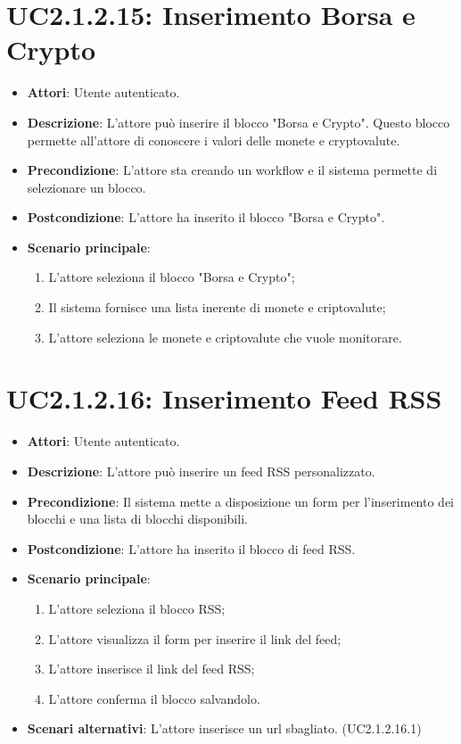 \section{UC2.1.2.15: Inserimento Borsa e Crypto}
\label{UC2.1.2.15}
\begin{itemize}
	\item \textbf{Attori}: Utente autenticato.
	\item \textbf{Descrizione}: L'attore può inserire il blocco "Borsa e Crypto". Questo blocco permette all'attore di conoscere i valori delle monete e cryptovalute. 
	\item \textbf{Precondizione}: L'attore sta creando un workflow e il sistema permette di selezionare un blocco.
	\item \textbf{Postcondizione}: L'attore ha inserito il blocco "Borsa e Crypto".
	\item \textbf{Scenario principale}:
	\begin{enumerate} \item L'attore seleziona il blocco "Borsa e Crypto";  \item  Il sistema fornisce una lista inerente di monete e criptovalute;  \item  L'attore seleziona le monete e criptovalute che vuole monitorare.\end{enumerate}
\end{itemize}

\section{UC2.1.2.16: Inserimento Feed RSS}
\label{UC2.1.2.16}
\begin{itemize}
	\item \textbf{Attori}: Utente autenticato.
	\item \textbf{Descrizione}: L'attore può inserire un feed RSS personalizzato.
	\item \textbf{Precondizione}: Il sistema mette a disposizione un form per l'inserimento dei blocchi e una lista di blocchi disponibili.
	\item \textbf{Postcondizione}: L'attore ha inserito il blocco di feed RSS.
	\item \textbf{Scenario principale}:
	\begin{enumerate} \item L'attore seleziona il blocco RSS; \item L'attore visualizza il form per inserire il link del feed; \item  L'attore inserisce il link del feed RSS; \item L'attore conferma il blocco salvandolo.\end{enumerate}
	\item \textbf{Scenari alternativi}:
	L'attore inserisce un url sbagliato. (UC2.1.2.16.1)
\end{itemize}


